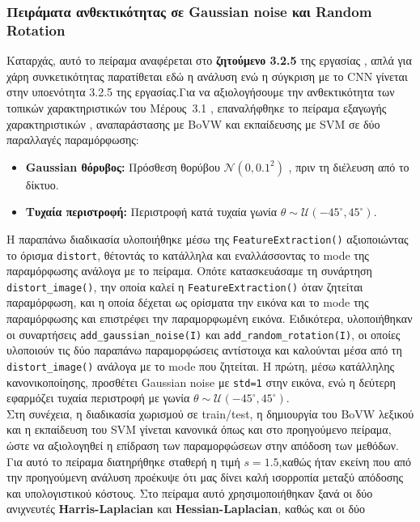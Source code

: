 \documentclass[12pt, a4paper]{article}
\begin{document}
\subsubsection{Πειράματα ανθεκτικότητας σε Gaussian noise και Random Rotation}

Καταρχάς, αυτό το πείραμα αναφέρεται στο \textbf{ζητούμενο 3.2.5} της εργασίας , απλά για χάρη συνκετικότητας παρατίθεται εδώ η ανάλυση
ενώ η σύγκριση με το CNN γίνεται στην υποενότητα 3.2.5 της εργασίας.Για να αξιολογήσουμε την ανθεκτικότητα των τοπικών χαρακτηριστικών του
Μέρους~3.1 , επαναλήφθηκε το πείραμα εξαγωγής χαρακτηριστικών , αναπαράστασης
με BoVW και εκπαίδευσης με SVM  σε δύο παραλλαγές παραμόρφωσης: 
\begin{itemize}
    \item \textbf{Gaussian θόρυβος:} Πρόσθεση θορύβου $\mathcal{N}(0, 0.1^2)$
    , πριν τη διέλευση από το δίκτυο.
    \item \textbf{Τυχαία περιστροφή:} Περιστροφή κατά τυχαία γωνία
    $\theta \sim \mathcal{U}(-45^\circ, 45^\circ)$.
\end{itemize}
Η παραπάνω διαδικασία υλοποιήθηκε μέσω της \texttt{FeatureExtraction()}
αξιοποιώντας το όρισμα \texttt{distort}, θέτοντάς το κατάλληλα και
εναλλάσσοντας το mode της παραμόρφωσης ανάλογα με το πείραμα.
Οπότε κατασκευάσαμε τη συνάρτηση \texttt{distort\_image()}, την οποία καλεί η
\texttt{FeatureExtraction()} όταν ζητείται παραμόρφωση, και η οποία δέχεται ως
ορίσματα την εικόνα και το mode της παραμόρφωσης και επιστρέφει την
παραμορφωμένη εικόνα.
Ειδικότερα, υλοποιήθηκαν οι συναρτήσεις \texttt{add\_gaussian\_noise(I)} και
\texttt{add\_random\_rotation(I)}, οι οποίες υλοποιούν τις δύο παραπάνω
παραμορφώσεις αντίστοιχα και καλούνται μέσα από τη \texttt{distort\_image()}
ανάλογα με το mode που ζητείται.
Η πρώτη, μέσω κατάλληλης κανονικοποίησης, προσθέτει Gaussian noise με
\texttt{std=1} στην εικόνα, ενώ η δεύτερη εφαρμόζει τυχαία περιστροφή με
γωνία $\theta \sim \mathcal{U}(-45^\circ, 45^\circ)$. \\
Στη συνέχεια, η διαδικασία χωρισμού σε train/test, η δημιουργία του BoVW λεξικού και η εκπαίδευση του SVM γίνεται κανονικά όπως και στο προηγούμενο πείραμα, ώστε να αξιολογηθεί η επίδραση των παραμορφώσεων στην απόδοση των μεθόδων.\\
Για αυτό το πείραμα διατηρήθηκε σταθερή η τιμή $s=1.5$,καθώς ήταν εκείνη που από την προηγούμενη
ανάλυση προέκυψε ότι μας δίνει καλή ισορροπία μεταξύ απόδοσης και υπολογιστικού κόστους.
Στο πείραμα αυτό χρησιμοποιήθηκαν ξανά οι δύο ανιχνευτές
\textbf{Harris-Laplacian} και \textbf{Hessian-Laplacian}, καθώς και οι δύο
\end{document}

